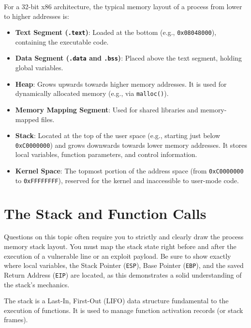 For a 32-bit x86 architecture, the typical memory layout of a process from lower to higher addresses is:
\begin{itemize}
    \item \textbf{Text Segment (\texttt{.text})}: Loaded at the bottom (e.g., \texttt{0x08048000}), containing the executable code.
    \item \textbf{Data Segment (\texttt{.data} and \texttt{.bss})}: Placed above the text segment, holding global variables.
    \item \textbf{Heap}: Grows upwards towards higher memory addresses. It is used for dynamically allocated memory (e.g., via \texttt{malloc()}).
    \item \textbf{Memory Mapping Segment}: Used for shared libraries and memory-mapped files.
    \item \textbf{Stack}: Located at the top of the user space (e.g., starting just below \texttt{0xC0000000}) and grows downwards towards lower memory addresses. It stores local variables, function parameters, and control information.
    \item \textbf{Kernel Space}: The topmost portion of the address space (from \texttt{0xC0000000} to \texttt{0xFFFFFFFF}), reserved for the kernel and inaccessible to user-mode code.
\end{itemize}

\section{The Stack and Function Calls}

\begin{tcolorbox}[colback=blue!5!white,colframe=blue!75!black,title=Exam Insight]
Questions on this topic often require you to strictly and clearly draw the process memory stack layout. You must map the stack state right before and after the execution of a vulnerable line or an exploit payload. Be sure to show exactly where local variables, the Stack Pointer (\texttt{ESP}), Base Pointer (\texttt{EBP}), and the saved Return Address (\texttt{EIP}) are located, as this demonstrates a solid understanding of the stack's mechanics.
\end{tcolorbox}

The stack is a Last-In, First-Out (LIFO) data structure fundamental to the execution of functions. It is used to manage function activation records (or stack frames). 

